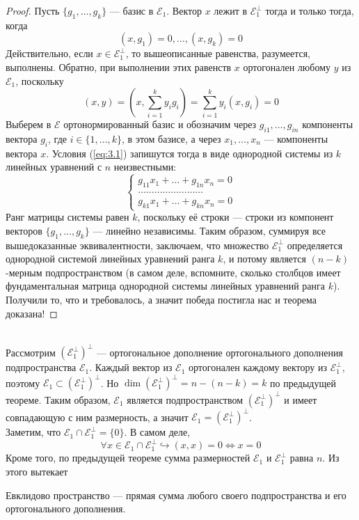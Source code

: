 \documentclass[11pt]{article}
\begin{document}
\begin{proof}
    Пусть $\{g_1, \ldots, g_k\}$ --- базис в $\mathcal{E}_1$. Вектор $x$ лежит в $\mathcal{E}_1^{\perp}$ тогда и только тогда, когда
    \begin{equation} \label{eq:3.1}
        (x, g_1) = 0, \ldots, (x, g_k) = 0
    \end{equation}
    Действительно, если $x \in \mathcal{E}_1^{\perp}$, то вышеописанные равенства, разумеется, выполнены. Обратно, при выполнении этих равенств $x$ ортогонален любому $y$ из $\mathcal{E}_1$, поскольку
    \[(x, y) = \left(x, \sum_{i = 1}^k y_i g_i \right) = \sum_{i = 1}^k y_i (x, g_i) = 0\]
    Выберем в $\mathcal{E}$ ортонормированный базис и обозначим через $g_{i1}, \ldots, g_{in}$ компоненты вектора $g_i$, где $i \in \{1, \ldots, k\}$, в этом базисе, а через $x_1, \ldots, x_n$ --- компоненты вектора $x$. Условия (\ref{eq:3.1}) запишутся тогда в виде однородной системы из $k$ линейных уравнений с $n$ неизвестными:
    \begin{equation*}
        \begin{cases}
            g_{11} x_1 + \ldots + g_{1n} x_n = 0 \\
            \ldots \ldots \ldots \ldots \ldots \ldots \ldots \ldots \\
            g_{k1} x_1 + \ldots + g_{kn} x_n = 0
        \end{cases}
    \end{equation*}
    Ранг матрицы системы равен $k$, поскольку её строки --- строки из компонент векторов $\{g_1, \ldots, g_k\}$ --- линейно независимы. Таким образом, суммируя все вышедоказанные эквивалентности, заключаем, что множество $\mathcal{E}_1^{\perp}$ определяется однородной системой линейных уравнений ранга $k$, и потому является $(n - k)$-мерным подпространством (в самом деле, вспомните, сколько столбцов имеет фундаментальная матрица однородной системы линейных уравнений ранга $k$). Получили то, что и требовалось, а значит победа постигла нас и теорема доказана!
\end{proof} \leavevmode
\\
Рассмотрим $(\mathcal{E}_1^{\perp})^{\perp}$ --- ортогональное дополнение ортогонального дополнения подпространства $\mathcal{E}_1$. Каждый вектор из $\mathcal{E}_1$ ортогонален каждому вектору из $\mathcal{E}_1^{\perp}$, поэтому $\mathcal{E}_1 \subset (\mathcal{E}_1^{\perp})^{\perp}$. Но $\dim (\mathcal{E}_1^{\perp})^{\perp} = n - (n - k) = k$ по предыдущей теореме. Таким образом, $\mathcal{E}_1$ является подпространством $(\mathcal{E}_1^{\perp})^{\perp}$ и имеет совпадающую с ним размерность, а значит $\mathcal{E}_1 = (\mathcal{E}_1^{\perp})^{\perp}$. \\
Заметим, что $\mathcal{E}_1 \cap \mathcal{E}_1^{\perp} = \{0\}$. В самом деле,
\[\forall x \in \mathcal{E}_1 \cap \mathcal{E}_1^{\perp} \hookrightarrow (x, x) = 0 \iff x = 0\]
Кроме того, по предыдущей теореме сумма размерностей $\mathcal{E}_1$ и $\mathcal{E}_1^{\perp}$ равна $n$. Из этого вытекает 
\begin{lemma}
    Евклидово пространство --- прямая сумма любого своего подпространства и его ортогонального дополнения.
\end{lemma}
\end{document}
